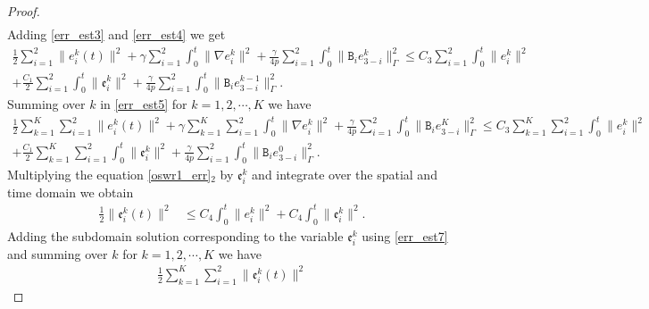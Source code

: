 \documentclass[11pt]{article}
\begin{document}
\begin{proof}
\begin{equation}
\begin{aligned}
\end{aligned}
\end{equation} 
Adding \eqref{err_est3} and \eqref{err_est4} we get
\begin{equation}\label{err_est5}
\begin{aligned}
\frac{1}{2}\sum_{i=1}^2\parallel e_i^{k}(t)\parallel^2 + \gamma \sum_{i=1}^2\int_0^t\parallel\nabla e_i^{k} \parallel^2 +\frac{\gamma}{4p} \sum_{i=1}^2\int_0^t\parallel\mathtt{B}_i e_{3-i}^{k}\parallel_{\Gamma}^2
 \leq C_3 \sum_{i=1}^2\int_0^t\parallel e_i^{k}\parallel^2 \\
 + \frac{C_1}{2} \sum_{i=1}^2\int_0^t\parallel \mathfrak{e}_i^{k}\parallel^2
+\frac{\gamma}{4p}\sum_{i=1}^2\int_0^t\parallel\mathtt{B}_i e_{3-i}^{k-1}\parallel_{\Gamma}^2.
\end{aligned}
\end{equation} 
Summing over $k$ in \eqref{err_est5} for $k=1,2,\cdots, K$ we have 
\begin{equation}\label{err_est6}
\begin{aligned}
\frac{1}{2}\sum_{k=1}^K\sum_{i=1}^2\parallel e_i^{k}(t)\parallel^2 + \gamma\sum_{k=1}^K\sum_{i=1}^2\int_0^t \parallel\nabla e_i^{k} \parallel^2 +\frac{\gamma}{4p} \sum_{i=1}^2\int_0^t\parallel\mathtt{B}_i e_{3-i}^{K}\parallel_{\Gamma}^2
 \leq C_3 \sum_{k=1}^K\sum_{i=1}^2\int_0^t\parallel e_i^{k}\parallel^2 \\
 + \frac{C_1}{2} \sum_{k=1}^K\sum_{i=1}^2\int_0^t\parallel \mathfrak{e}_i^{k}\parallel^2
+\frac{\gamma}{4p}\sum_{i=1}^2\int_0^t\parallel\mathtt{B}_i e_{3-i}^{0}\parallel_{\Gamma}^2.
\end{aligned}
\end{equation} 
Multiplying the equation \eqref{oswr1_err}$_2$ by $\mathfrak{e}_i^{k}$ and integrate over the spatial and time domain we obtain 
\begin{equation}\label{err_est7}
\begin{aligned}
\frac{1}{2}\parallel \mathfrak{e}_i^{k}(t)\parallel^2 
& \leq C_4 \int_0^t\parallel e_i^{k}\parallel^2 + C_4 \int_0^t\parallel \mathfrak{e}_i^{k}\parallel^2.
\end{aligned}
\end{equation} 
Adding the subdomain solution corresponding to the variable $\mathfrak{e}_i^{k}$ using \eqref{err_est7} and summing over $k$ for $k=1, 2, \cdots, K$ we have 
\begin{equation}\label{err_est8}
\begin{aligned}
\frac{1}{2}\sum_{k=1}^K\sum_{i=1}^2\parallel \mathfrak{e}_i^{k}(t)\parallel^2 

\end{aligned}
\end{equation}
\end{proof}
\end{document}
